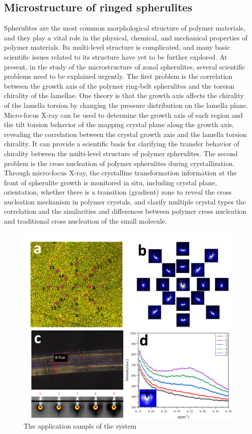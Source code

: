 \documentclass{Head}
\begin{document}
\subsection{Microstructure of ringed spherulites}
Spherulites are the most common morphological structure of polymer materials, and they play a vital role in the physical, chemical, and mechanical properties of polymer materials. Its multi-level structure is complicated, and many basic scientific issues related to its structure have yet to be further explored.
At present, in the study of the microstructure of zonal spherulites, several scientific problems need to be explained urgently\cite{RN33}. The first problem is the correlation between the growth axis of the polymer ring-belt spherulites and the torsion chirality of the lamellae.
One theory is that the growth axis affects the chirality of the lamella torsion by changing the pressure distribution on the lamella plane.
Micro-focus X-ray can be used to determine the growth axis of each region and the tilt torsion behavior of the mapping crystal plane along the growth axis, revealing the correlation between the crystal growth axis and the lamella torsion chirality. It can provide a scientific basis for clarifying the transfer behavior of chirality between the multi-level structure of polymer spherulites.
The second problem is the cross nucleation of polymer spherulites during crystallization.
Through micro-focus X-ray, the crystalline transformation information at the front of spherulite growth is monitored in situ, including crystal plane, orientation, whether there is a transition (gradient) zone to reveal the cross nucleation mechanism in polymer crystals, and clarify multiple crystal types the correlation and the similarities and differences between polymer cross nucleation and traditional cross nucleation of the small molecule.
\begin{figure}
    \centering
    \includegraphics[scale=0.4]{Figures/Fig7AppliedResearch.png}
    \caption{The application sample of the system}
    \label{apply}
\end{figure}
\end{document}

